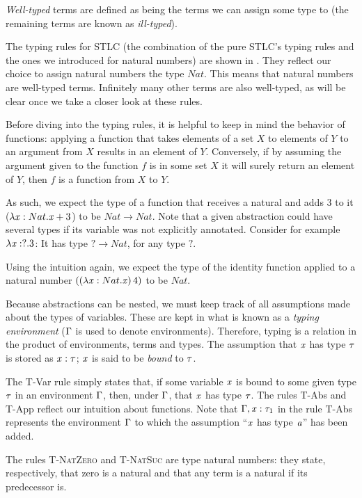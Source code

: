 \textit{Well-typed} terms are defined as being the terms we can assign some type to (the remaining terms are known as \textit{ill-typed}).

The typing rules for STLC (the combination of the pure STLC's typing rules and the ones we introduced for natural numbers) are shown in . They reflect our choice to assign natural numbers the type $Nat$. This means that natural numbers are well-typed terms. Infinitely many other terms are also well-typed, as will be clear once we take a closer look at these rules.

Before diving into the typing rules, it is helpful to keep in mind the behavior of functions: applying a function that takes elements of a set $X$ to elements of $Y$ to an argument from $X$ results in an element of $Y$. Conversely, if by assuming the argument given to the function $f$ is in some set $X$ it will surely return an element of $Y$, then $f$ is a function from $X$ to $Y$.

As such, we expect the type of a function that receives a natural and adds $3$ to it ($\lambda \mathit{x}:Nat.\mathit{x}+3$) to be $Nat \rightarrow Nat$. Note that a given abstraction could have several types if its variable was not explicitly annotated. Consider for example $\lambda \mathit{x}:?.3$: It has type $? \to Nat$, for any type $?$.

Using the intuition again, we expect the type of the identity function applied to a natural number $((\lambda \mathit{x}: Nat. \mathit{x}) \, 4)$ to be $Nat$. 

Because abstractions can be nested, we must keep track of all assumptions made about the types of variables. These are kept in what is known as a \textit{typing  environment} ($\Gamma$ is used to denote environments). Therefore, typing is a relation in the product of environments, terms and types. The assumption that $\mathit{x}$ has type $\mathit{\tau}$ is stored as $\mathit{x}:\mathit{\tau}$; $\mathit{x}$ is said to be \textit{bound} to $\mathit{\tau}$.

The T-Var rule simply states that, if some variable $\mathit{x}$ is bound to some given type $\mathit{\tau}$ in an environment $\Gamma$, then, under $\Gamma$, that $\mathit{x}$ has type $\mathit{\tau}$. The rules T-Abs and T-App reflect our intuition about functions. Note that $\Gamma,\mathit{x}:\mathit{\tau}_1$ in the rule T-Abs represents the environment $\Gamma$ to which the assumption ``$\mathit{x}$ has type $\mathit{a}$'' has been added.

The rules \textsc{T-NatZero} and \textsc{T-NatSuc} are type natural numbers: they state, respectively, that zero is a natural and that any term is a natural if its predecessor is.

